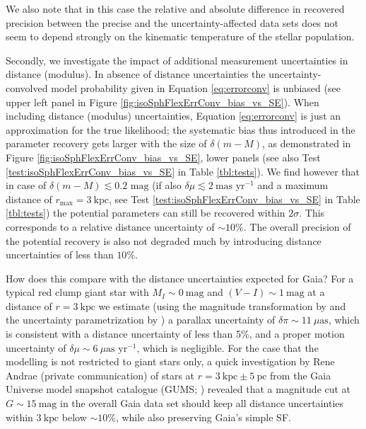 \documentclass[iop,revtex4,numberedappendix,appendixfloats]{emulateapj}
\begin{document}
We also note that in this case the relative and absolute difference in recovered precision between the precise and the uncertainty-affected data sets does not seem to depend strongly on the kinematic temperature of the stellar population.

Secondly, we investigate the impact of additional measurement uncertainties in distance (modulus). In absence of distance uncertainties the uncertainty-convolved model probability given in Equation \eqref{eq:errorconv} is unbiased (see upper left panel in Figure \ref{fig:isoSphFlexErrConv_bias_vs_SE}). When including distance (modulus) uncertainties, Equation \eqref{eq:errorconv} is just an approximation for the true likelihood; the systematic bias thus introduced in the parameter recovery gets larger with the size of $\delta (m-M)$, as demonstrated in Figure \ref{fig:isoSphFlexErrConv_bias_vs_SE}, lower panels (see also Test \ref{test:isoSphFlexErrConv_bias_vs_SE} in Table \ref{tbl:tests}). We find however that in case of $\delta(m-M) \lesssim 0.2 \text{ mag}$ (if also $\delta \mu \lesssim 2 ~\text{mas yr}^{-1}$ and a maximum distance of $r_\text{max} = 3~\text{kpc}$, see Test \ref{test:isoSphFlexErrConv_bias_vs_SE} in Table \ref{tbl:tests}) the potential parameters can still be recovered within $2 \sigma$. This corresponds to a relative distance uncertainty of $\sim10\%$. The overall precision of the potential recovery is also not degraded much by introducing distance uncertainties of less than $10\%$.

How does this compare with the distance uncertainties expected for Gaia? For a typical red clump giant star with $M_I\sim0~\text{mag}$ and $(V-I)\sim1~\text{mag}$ at a distance of $r=3~\text{kpc}$ we estimate (using the magnitude transformation by \citet{2010A&A...523A..48J} and the uncertainty parametrization by \citet{2014EAS....67...23D}) a parallax uncertainty of $\delta\pi\sim11~\mu\text{as}$, which is consistent with a distance uncertainty of less than 5\%, and a proper motion uncertainty of $\delta \mu\sim6~\mu\text{as yr}^{-1}$, which is negligible. For the case that the modelling is not restricted to giant stars only, a quick investigation by Rene Andrae (private communication) of stars at $r=3~\text{kpc}\pm5~\text{pc}$ from the Gaia Universe model snapshot catalogue (GUMS; \citealt{2012A&A...543A.100R}) revealed that a magnitude cut at $G\sim15~\text{mag}$ in the overall Gaia data set should keep all distance uncertainties within $3~\text{kpc}$ below $\sim10\%$, while also preserving Gaia's simple SF.
\end{document}
